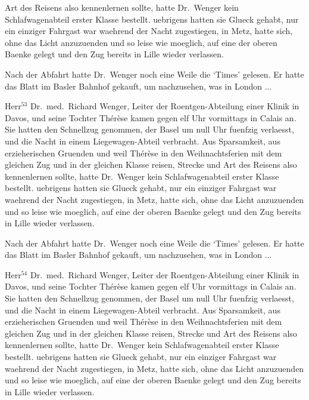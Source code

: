 Art des Reisens also kennenlernen sollte, hatte Dr.~Wenger
kein Schlafwagenabteil erster Klasse bestellt.
uebrigens hatten sie Glueck gehabt, nur ein
einziger Fahrgast war waehrend der Nacht zugestiegen,
in Metz, hatte sich, ohne das Licht anzuzuenden
und so leise wie moeglich, auf eine der oberen
Baenke gelegt und den Zug bereits in Lille wieder
verlassen.\par
Nach der Abfahrt hatte Dr.~Wen\-ger noch eine
Weile die `Times' gelesen. Er hatte das Blatt im
Basler Bahnhof gekauft, um nachzusehen, was in London ...\par
Herr$^{53}$ Dr.~med.~Richard Wenger, Leiter der Roent\-gen-Ab\-tei\-lung
einer Klinik in Davos, und seine
Tochter Th\'e\-r\`ese kamen gegen elf Uhr vormittags
in Calais an. Sie hatten den Schnellzug genommen,
der Basel um null Uhr fuenfzig verlaesst, und die
Nacht in einem Liege\-wagen-Abteil verbracht.
Aus Sparsamkeit, aus erzieherischen
Gruenden und weil
Th\'e\-r\`ese in den Weihnachtsferien mit dem gleichen
Zug und in der gleichen Klasse reisen, Strecke und
Art des Reisens also kennenlernen sollte, hatte Dr.~Wenger
kein Schlafwagenabteil erster Klasse bestellt.
uebrigens hatten sie Glueck gehabt, nur ein
einziger Fahrgast war waehrend der Nacht zugestiegen,
in Metz, hatte sich, ohne das Licht anzuzuenden
und so leise wie moeglich, auf eine der oberen
Baenke gelegt und den Zug bereits in Lille wieder
verlassen.\par
Nach der Abfahrt hatte Dr.~Wen\-ger noch eine
Weile die `Times' gelesen. Er hatte das Blatt im
Basler Bahnhof gekauft, um nachzusehen, was in London ...\par
Herr$^{54}$ Dr.~med.~Richard Wenger, Leiter der Roent\-gen-Ab\-tei\-lung
einer Klinik in Davos, und seine
Tochter Th\'e\-r\`ese kamen gegen elf Uhr vormittags
in Calais an. Sie hatten den Schnellzug genommen,
der Basel um null Uhr fuenfzig verlaesst, und die
Nacht in einem Liege\-wagen-Abteil verbracht.
Aus Sparsamkeit, aus erzieherischen
Gruenden und weil
Th\'e\-r\`ese in den Weihnachtsferien mit dem gleichen
Zug und in der gleichen Klasse reisen, Strecke und
Art des Reisens also kennenlernen sollte, hatte Dr.~Wenger
kein Schlafwagenabteil erster Klasse bestellt.
uebrigens hatten sie Glueck gehabt, nur ein
einziger Fahrgast war waehrend der Nacht zugestiegen,
in Metz, hatte sich, ohne das Licht anzuzuenden
und so leise wie moeglich, auf eine der oberen
Baenke gelegt und den Zug bereits in Lille wieder
verlassen.\par
